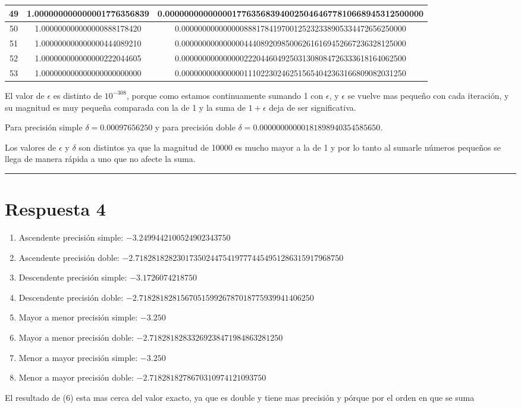 \documentclass{article}
\begin{document}
\begin{itemize}
\begin{longtable}{|c||c|c|}
		49 & 1.000000000000001776356839 & 0.000000000000001776356839400250464677810668945312500000 \\ \hline 
		50 & 1.000000000000000888178420 & 0.000000000000000888178419700125232338905334472656250000 \\ \hline 
		51 & 1.000000000000000444089210 & 0.000000000000000444089209850062616169452667236328125000 \\ \hline 
		52 & 1.000000000000000222044605 & 0.000000000000000222044604925031308084726333618164062500 \\ \hline 
		53 & 1.000000000000000000000000 & 0.000000000000000111022302462515654042363166809082031250 \\ \hline 

	\end{longtable}
	
	El valor de $\epsilon$ es distinto de $10^{-308}$, porque como estamos continuamente sumando
	1 con $\epsilon$, y $\epsilon$ se vuelve mas pequeño con cada iteración, y su magnitud es muy pequeña
	comparada con la de 1 y la suma de $1 + \epsilon$ deja de ser significativa.
	
	Para precisión simple $\delta = 0.00097656250$ y para precisión doble $\delta = 0.00000000000181898940354585650.$
	
	Los valores de $\epsilon$ y $\delta$ son distintos ya que la magnitud de 10000 es mucho mayor a la de 1 y por lo tanto
	al sumarle números pequeños se llega de manera rápida a uno que no afecte la suma.
\end{itemize}


\hrule
\section*{Respuesta 4}
\begin{enumerate}
	\item Ascendente precisión simple: $-3.2499442100524902343750$
	\item Ascendente precisión doble: $-2.71828182823017350244754197774454951286315917968750$
	\item Descendente precisión simple: $-3.1726074218750$
	\item Descendente precisión doble: $-2.718281828156705159926787018775939941406250$
	\item Mayor a menor precisión simple: $-3.250$
	\item Mayor a menor precisión doble: $-2.71828182833269238471984863281250$
	\item Menor a mayor precisión simple: $-3.250$ 
	\item Menor a mayor precisión doble: $-2.7182818278670310974121093750$
\end{enumerate}
	El resultado de (6) esta mas cerca del valor exacto, ya que es double y tiene mas precisión
	y pórque por el orden en que se suma
\end{document}
